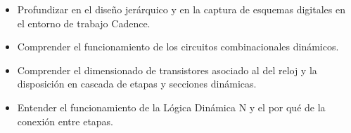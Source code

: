{\begin{itemize}
    \item Profundizar en el diseño jerárquico y en la captura de esquemas digitales en el entorno de trabajo Cadence.
    \item Comprender el funcionamiento de los circuitos combinacionales dinámicos.
    \item Comprender el dimensionado de transistores asociado al del reloj y la disposición en cascada de etapas y secciones dinámicas.
    \item Entender el funcionamiento de la Lógica Dinámica N y el por qué de la conexión entre etapas.
\end{itemize}
}

